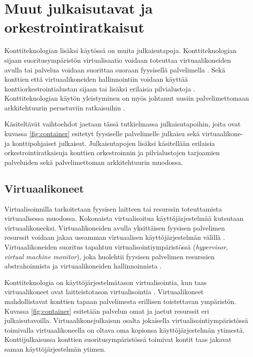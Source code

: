 \chapter{Muut julkaisutavat ja orkestrointiratkaisut\label{options}}

Konttiteknologian lisäksi käytössä on muita julkaisutapoja.
Konttiteknologian sijaan suoritusympäristön virtualisaatio voidaan toteuttaa virtuaalikoneiden avulla tai palvelua voidaan suorittaa suoraan fyysisellä palvelimella \cite{Watada19}.
Sekä konttien että virtuaalikoneiden hallinnointiin voidaan käyttää konttiorkestrointialustan sijaan tai lisäksi erilaisia pilvialustoja \cite{Bousselmi14}.
Konttiteknologian käytön yleistyminen on myös johtanut uusiin palvelimettomaan arkkitehtuurin perustuviin ratkaisuihin \cite{Baldini17}.

Käsiteltävät vaihtoehdot jaetaan tässä tutkielmassa julkaisutapoihin, joita ovat kuvassa \ref{fig:container} esitetyt fyysiselle palvelimelle julkaisu sekä virtuaalikone- ja konttipohjaiset julkaisut.
Julkaisutapojen lisäksi käsitellään erilaisia orkestrointiratkaisuja konttien orkestroinnin ja pilvialustojen tarjoamien palveluiden sekä palvelimettoman arkkitehtuurin muodossa.

\section{Virtuaalikoneet}

Virtualisoinnilla tarkoitetaan fyysisen laitteen tai resurssin toteuttamista virtuaalisessa muodossa.
Kokonaista virtualisoitua käyttöjärjestelmää kutsutaan virtuaalikoneeksi.
Virtuaalikoneiden avulla yksittäisen fyysisen palvelimen resurssit voidaan jakaa useamman virtuaalisen käyttöjärjestelmän välillä \cite{Smith05}.
Virtuaalikoneiden suoritus tapahtuu virtualisointiympäristössä (\textit{hypervisor}, \textit{virtual machine monitor}), joka huolehtii fyysisen palvelimen resurssien abstrahoinnista ja virtuaalikoneiden hallinnoinnista \cite{desai13}.

Konttiteknologia on käyttöjärjestelmätason virtualisointia, kun taas virtuaalikoneet ovat laitteistotason virtualisointia \cite{Compastie20}.
Virtuaalikoneet mahdollistavat konttien tapaan palvelimesta erillisen toistettavan ympäristön.
Kuvassa \ref{fig:container} esitetään palvelun omat ja jaetut resurssit eri julkaisutavoilla.
Virtuaalikonejulkaisun osalta jokaisella virtualisointiympäristössä toimivalla virtuaalikoneella on oltava oma kopionsa käyttöjärjestelmän ytimestä.
Konttijulkaisussa konttien suoritusympäristössä toimivat kontit taas jakavat saman käyttöjärjestelmän ytimen.

